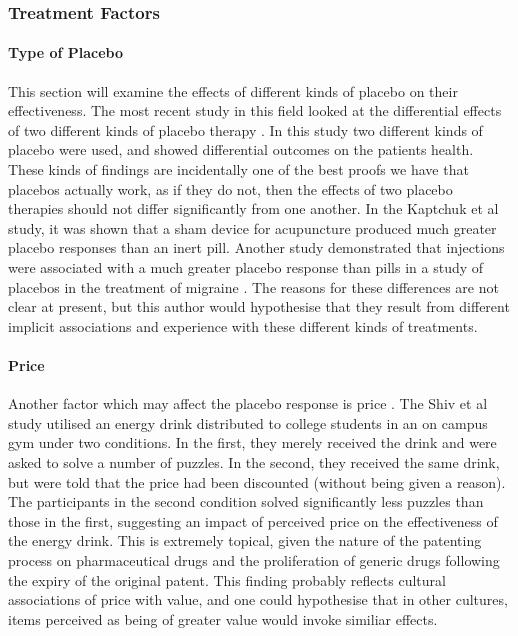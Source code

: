 \subsubsection{Treatment Factors}

\paragraph{Type of Placebo}
\label{sec:type-placebo}
This section will examine the effects of different kinds of placebo on their effectiveness. The most recent study in this field looked at the differential effects of two different kinds of placebo therapy \cite{Kaptchuk2006}. In this study two different kinds of placebo were used, and showed differential outcomes on the patients health. These kinds of findings are incidentally one of the best proofs we have that placebos actually work, as if they do not, then the effects of two placebo therapies should not differ significantly from one another. In the Kaptchuk et al study, it was shown that a sham device for acupuncture produced much greater placebo responses than an inert pill. Another study demonstrated that injections were associated with a much greater placebo response than pills in a study of placebos in the treatment of migraine \cite{Craen2000}. The reasons for these differences are not clear at present, but this author would hypothesise that they result from different implicit associations and experience with these different kinds of treatments.  

\paragraph{Price}
\label{sec:price}
Another factor which may affect the placebo response is price \cite{Shiv2005a}. The Shiv et al study utilised an energy drink distributed to college students in an on campus gym under two conditions. In the first, they merely received the drink and were asked to solve a number of puzzles. In the second, they received the same drink, but were told that the price had been discounted (without being given a reason). The participants in the second condition solved significantly less puzzles than those in the first, suggesting an impact of perceived price on the effectiveness of the energy drink. This is extremely topical, given the nature of the patenting process on pharmaceutical drugs and the proliferation of generic drugs following the expiry of the original patent. This finding probably reflects cultural associations of price with value, and one could hypothesise that in other cultures, items perceived as being of greater value would invoke similiar effects.  

